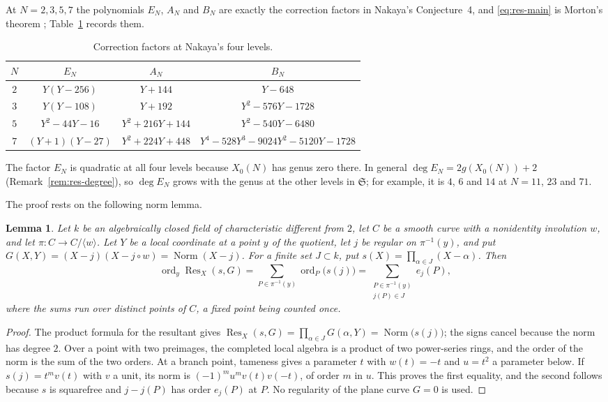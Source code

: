 \documentclass[11pt,a4paper]{article}
\newtheorem{lemma}[theorem]{Lemma}
\theoremstyle{remark}\newtheorem{remark}[theorem]{Remark}
\numberwithin{equation}{section}
\begin{document}
	At $N=2,3,5,7$ the polynomials $E_N$, $A_N$ and $B_N$ are exactly the correction factors in Nakaya's Conjecture~4, and \eqref{eq:res-main} is Morton's theorem \cite[Theorems~1, 3 and~5]{MortonFricke}; Table~\ref{tab:res-small} records them.
	
	\begin{table}[ht]\centering
		\begin{tabular}{cccc}\toprule
			$N$ & $E_N$ & $A_N$ & $B_N$\\\midrule
			$2$ & $Y(Y-256)$ & $Y+144$ & $Y-648$\\
			$3$ & $Y(Y-108)$ & $Y+192$ & $Y^2-576Y-1728$\\
			$5$ & $Y^2-44Y-16$ & $Y^2+216Y+144$ & $Y^2-540Y-6480$\\
			$7$ & $(Y+1)(Y-27)$ & $Y^2+224Y+448$ & $Y^4-528Y^3-9024Y^2-5120Y-1728$\\\bottomrule
		\end{tabular}
		\caption{Correction factors at Nakaya's four levels.}\label{tab:res-small}
	\end{table}

	The factor $E_N$ is quadratic at all four levels because $X_0(N)$ has genus zero there. In general $\deg E_N=2g(X_0(N))+2$ (Remark~\ref{rem:res-degree}), so $\deg E_N$ grows with the genus at the other levels in $\mathfrak S$; for example, it is $4$, $6$ and $14$ at $N=11$, $23$ and $71$.
	
	The proof rests on the following norm lemma.
	
	\begin{lemma}\label{lem:norm}
		Let $k$ be an algebraically closed field of characteristic different from $2$, let $C$ be a smooth curve with a nonidentity involution $w$, and let $\pi\colon C\to C/\langle w\rangle$. Let $Y$ be a local coordinate at a point $y$ of the quotient, let $j$ be regular on $\pi^{-1}(y)$, and put $G(X,Y)=(X-j)(X-j\circ w)=\operatorname{Norm}(X-j)$. For a finite set $J\subset k$, put $s(X)=\prod_{\alpha\in J}(X-\alpha)$. Then
		\[
		\operatorname{ord}_{y}\operatorname{Res}_X(s,G)=\sum_{P\in\pi^{-1}(y)}\operatorname{ord}_P\bigl(s(j)\bigr)=\sum_{\substack{P\in\pi^{-1}(y)\\ j(P)\in J}}e_j(P),
		\]
		where the sums run over distinct points of $C$, a fixed point being counted once.
	\end{lemma}
	\begin{proof}
		The product formula for the resultant gives $\operatorname{Res}_X(s,G)=\prod_{\alpha\in J}G(\alpha,Y)=\operatorname{Norm}\bigl(s(j)\bigr)$; the signs cancel because the norm has degree $2$. Over a point with two preimages, the completed local algebra is a product of two power-series rings, and the order of the norm is the sum of the two orders. At a branch point, tameness gives a parameter $t$ with $w(t)=-t$ and $u=t^2$ a parameter below. If $s(j)=t^mv(t)$ with $v$ a unit, its norm is $(-1)^mu^mv(t)v(-t)$, of order $m$ in $u$. This proves the first equality, and the second follows because $s$ is squarefree and $j-j(P)$ has order $e_j(P)$ at $P$. No regularity of the plane curve $G=0$ is used.
	\end{proof}
	
\end{document}
